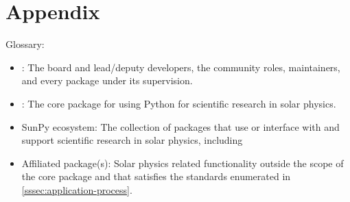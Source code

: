 \section*{Appendix}
\label{sec:appendix}

Glossary:

\begin{itemize}
\item \sunpyproj: The board and lead/deputy developers, the community roles, maintainers, and every package under its supervision.
\item \sunpypkg: The core package for using Python for scientific research in solar physics.
\item SunPy ecosystem: The collection of packages that use or interface with \sunpypkg and support scientific research in solar physics, including \sunpypkg
\item Affiliated package(s): Solar physics related functionality outside the scope of the \sunpypkg core package and that satisfies the standards enumerated in \autoref{sssec:application-process}.
\end{itemize}
